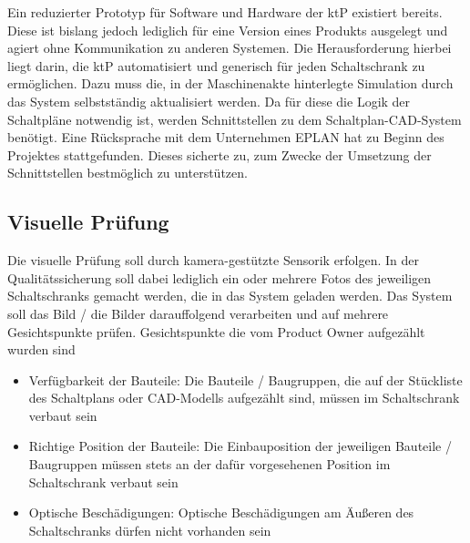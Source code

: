 \documentclass[
    type=Projektarbeit,
    status=draft, %
    language=german, %
    bibengine=bibtex,
]{unibwm-inf-thesis}
\begin{document}
    Ein reduzierter Prototyp für Software und Hardware der \ac{ktP} existiert bereits.
    Diese ist bislang jedoch lediglich für eine Version eines Produkts ausgelegt und agiert ohne Kommunikation zu anderen Systemen.
    Die Herausforderung hierbei liegt darin, die \ac{ktP} automatisiert und generisch für jeden Schaltschrank zu ermöglichen.
    Dazu muss die, in der Maschinenakte hinterlegte Simulation durch das System selbstständig aktualisiert werden.
    Da für diese die Logik der Schaltpläne notwendig ist, werden Schnittstellen zu dem Schaltplan-CAD-System benötigt.
    Eine Rücksprache mit dem Unternehmen EPLAN hat zu Beginn des Projektes stattgefunden.
    Dieses sicherte zu, zum Zwecke der Umsetzung der Schnittstellen bestmöglich zu unterstützen.

    \subsection{Visuelle Prüfung}\label{subsec:visuelle-prufung}
    Die visuelle Prüfung soll durch kamera-gestützte Sensorik erfolgen.
    In der Qualitätssicherung soll dabei lediglich ein oder mehrere Fotos des jeweiligen Schaltschranks gemacht werden, die in das System geladen werden.
    Das System soll das Bild / die Bilder darauffolgend verarbeiten und auf mehrere Gesichtspunkte prüfen.
    Gesichtspunkte die vom Product Owner aufgezählt wurden sind
    \begin{itemize}
        \item Verfügbarkeit der Bauteile: Die Bauteile / Baugruppen, die auf der Stückliste des Schaltplans oder
         CAD-Modells aufgezählt sind, müssen im Schaltschrank verbaut sein
        \item Richtige Position der Bauteile: Die Einbauposition der jeweiligen Bauteile / Baugruppen müssen stets an
        der dafür vorgesehenen Position im Schaltschrank verbaut sein
        \item Optische Beschädigungen: Optische Beschädigungen am Äußeren des Schaltschranks dürfen nicht vorhanden sein
    \end{itemize}
\end{document}
